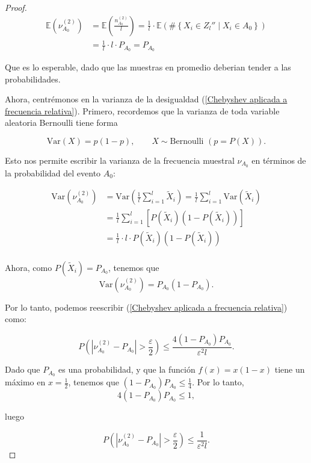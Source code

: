 \documentclass{report}
\begin{document}
\begin{proof}
\[
\begin{aligned}
    \mathbb{E}\left(\nu_{A_0}^{(2)} \right) &= \mathbb{E}\left(\frac{n_{A_0}^{(2)}}{l} \right) =  \frac{1}{l} \cdot \mathbb{E}\left( \#\left\{X_i\in Z_l''\mid X_i\in A_0\right\}\right)\\
    &= \frac{1}{l} \cdot l \cdot P_{A_0} = P_{A_0}
\end{aligned}
\]

Que es lo esperable, dado que las muestras en promedio deberian tender a las probabilidades.

Ahora, centrémonos en la varianza de la desigualdad (\ref{Chebyshev aplicada a frecuencia relativa}). Primero,
recordemos que la varianza de toda variable aleatoria Bernoulli tiene forma

\[
     \text{Var}(X) = p(1-p), \qquad X \sim \text{Bernoulli } (p=P(X)).
\]
\bigskip

Esto nos permite escribir la varianza de la frecuencia muestral $\nu_{A_0}$ en términos de la probabilidad del evento $A_0$:

\[
\begin{aligned}
    \text{Var}\left(\nu_{A_0}^{(2)}\right) &=\text{Var}\left(\frac{1}{l}\sum_{i=1}^l \tilde{X}_i\right)
    = \frac{1}{l}\sum_{i=1}^l \text{Var}\left(\tilde{X}_i\right)\\
    &= \frac{1}{l}\sum_{i=1}^l \left[P(\tilde{X}_i)(1-P(\tilde{X}_i))\right]\\
    &=\frac{1}{l} \cdot l\cdot P(\tilde{X}_i)(1-P(\tilde{X}_i)) \\
\end{aligned}
\]

Ahora, como $P(\tilde{X}_i) = P_{A_0}$, tenemos que
\[
    \text{Var}\left(\nu_{A_0}^{(2)}\right) = P_{A_0}(1-P_{A_0}).
\]

Por lo tanto, podemos reescribir (\ref{Chebyshev aplicada a frecuencia relativa}) como:

\[
P\left( \left| \nu^{(2)}_{A_0} - P_{A_0} \right| > \frac{\varepsilon}{2} \right)
\leq \frac{4(1 - P_{A_0}) P_{A_0}}{\varepsilon^2 l}.
\]

Dado que $P_{A_0}$ es una probabilidad, y que la función $f(x)=x(1-x)$ tiene un máximo en $x=\frac{1}{2}$, tenemos que
$(1 - P_{A_0}) P_{A_0} \leq \frac{1}{4}$. Por lo tanto,
\[4(1 - P_{A_0}) P_{A_0} \leq 1,
\]

luego

\[
P\left( \left| \nu^{(2)}_{A_0} - P_{A_0} \right| > \frac{\varepsilon}{2} \right) \leq \frac{1}{\varepsilon^2 l}.
\]


\end{proof}
\end{document}
